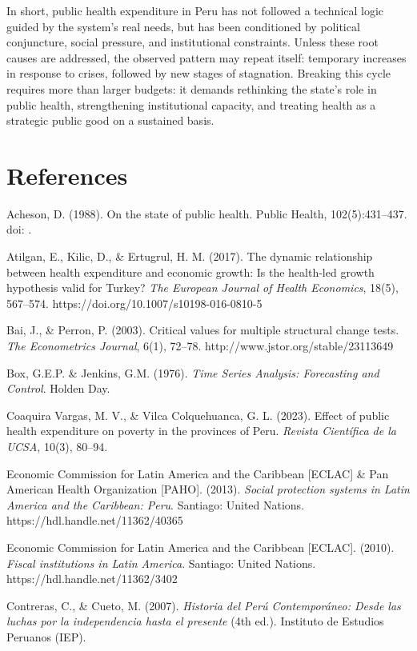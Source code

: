 \documentclass[12pt]{article}
\begin{document}
In short, public health expenditure in Peru has not followed a technical logic guided by the system’s real needs, but has been conditioned by political conjuncture, social pressure, and institutional constraints. Unless these root causes are addressed, the observed pattern may repeat itself: temporary increases in response to crises, followed by new stages of stagnation. Breaking this cycle requires more than larger budgets: it demands rethinking the state’s role in public health, strengthening institutional capacity, and treating health as a strategic public good on a sustained basis.

\section{References}

Acheson, D. (1988). On the state of public health. Public Health, 102(5):431–437. doi: .

Atilgan, E., Kilic, D., \& Ertugrul, H. M. (2017). The dynamic relationship between health expenditure and economic growth: Is the health-led growth hypothesis valid for Turkey? \textit{The European Journal of Health Economics}, 18(5), 567–574. https://doi.org/10.1007/s10198-016-0810-5

Bai, J., \& Perron, P. (2003). Critical values for multiple structural change tests. \textit{The Econometrics Journal}, 6(1), 72–78. http://www.jstor.org/stable/23113649

Box, G.E.P. \& Jenkins, G.M. (1976). \textit{Time Series Analysis: Forecasting and Control}. Holden Day.

Coaquira Vargas, M. V., \& Vilca Colquehuanca, G. L. (2023). Effect of public health expenditure on poverty in the provinces of Peru. \textit{Revista Científica de la UCSA}, 10(3), 80–94.

Economic Commission for Latin America and the Caribbean [ECLAC] \& Pan American Health Organization [PAHO]. (2013). \textit{Social protection systems in Latin America and the Caribbean: Peru}. Santiago: United Nations. https://hdl.handle.net/11362/40365

Economic Commission for Latin America and the Caribbean [ECLAC]. (2010). \textit{Fiscal institutions in Latin America}. Santiago: United Nations. https://hdl.handle.net/11362/3402

Contreras, C., \& Cueto, M. (2007). \textit{Historia del Perú Contemporáneo: Desde las luchas por la independencia hasta el presente} (4th ed.). Instituto de Estudios Peruanos (IEP).
\end{document}
